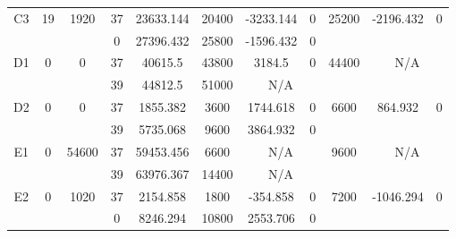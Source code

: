 \begin{sidewaystable}
\begin{tabular}{c||c|c||c|c|c|c|c||c|c|c}
         &
        
      \\
      \hline
      \multirow{2}{*}{C3} &
      \multirow{2}{*}{19} &
      \multirow{2}{*}{1920} &
      37 &
      23633.144 &
      20400 &
        -3233.144 &
        0 &
      \multirow{2}{*}{25200} &
        \multirow{2}{*}{-2196.432} &
        \multirow{2}{*}{0}
      \\
      \cline{4-8}
       &
       &
       &
      0 &
      27396.432 &
      25800 &
        -1596.432 &
        0 &
      
         &
        
      \\
      \hline
      \multirow{2}{*}{D1} &
      \multirow{2}{*}{0} &
      \multirow{2}{*}{0} &
      37 &
      40615.5 &
      43800 &
        3184.5 &
        0 &
      \multirow{2}{*}{44400} &
        \multicolumn{2}{c}{\multirow{2}{*}{N/A}}
      \\
      \cline{4-8}
       &
       &
       &
      39 &
      44812.5 &
      51000 &
        \multicolumn{2}{|c||}{N/A} &
      
        
      \\
      \hline
      \multirow{2}{*}{D2} &
      \multirow{2}{*}{0} &
      \multirow{2}{*}{0} &
      37 &
      1855.382 &
      3600 &
        1744.618 &
        0 &
      \multirow{2}{*}{6600} &
        \multirow{2}{*}{864.932} &
        \multirow{2}{*}{0}
      \\
      \cline{4-8}
       &
       &
       &
      39 &
      5735.068 &
      9600 &
        3864.932 &
        0 &
      
         &
        
      \\
      \hline
      \multirow{2}{*}{E1} &
      \multirow{2}{*}{0} &
      \multirow{2}{*}{54600} &
      37 &
      59453.456 &
      6600 &
        \multicolumn{2}{|c||}{N/A} &
      \multirow{2}{*}{9600} &
        \multicolumn{2}{c}{\multirow{2}{*}{N/A}}
      \\
      \cline{4-8}
       &
       &
       &
      39 &
      63976.367 &
      14400 &
        \multicolumn{2}{|c||}{N/A} &
      
        
      \\
      \hline
      \multirow{2}{*}{E2} &
      \multirow{2}{*}{0} &
      \multirow{2}{*}{1020} &
      37 &
      2154.858 &
      1800 &
        -354.858 &
        0 &
      \multirow{2}{*}{7200} &
        \multirow{2}{*}{-1046.294} &
        \multirow{2}{*}{0}
      \\
      \cline{4-8}
       &
       &
       &
      0 &
      8246.294 &
      10800 &
        2553.706 &
        0 &
      

\end{tabular}
\end{sidewaystable}
